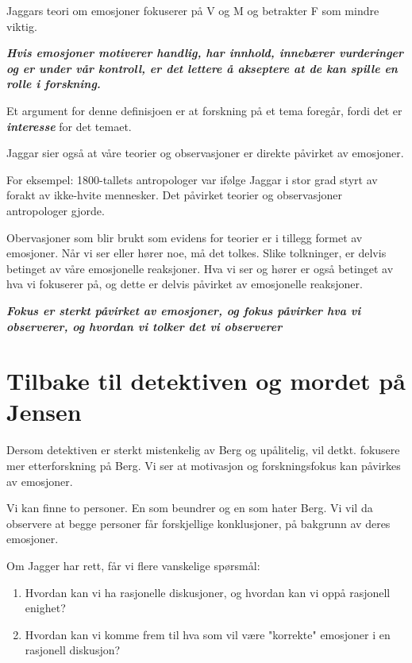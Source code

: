 \documentclass[11pt, a4paper]{article}
\begin{document}
\vspace{1em}

Jaggars teori om emosjoner fokuserer på V og M og betrakter F som mindre viktig. 
\vspace{1em}

\textbf{\textit{Hvis emosjoner motiverer handlig, har innhold, innebærer vurderinger og er under vår kontroll, er det lettere å akseptere at de kan spille en rolle i forskning.}}



Et argument for denne definisjoen er at forskning på et tema foregår, fordi det er \textbf{\textit{interesse}} for det temaet.

\vspace{1em}
Jaggar sier også at våre teorier og observasjoner er direkte påvirket av emosjoner.

For eksempel: 1800-tallets antropologer var ifølge Jaggar i stor grad styrt av forakt av ikke-hvite mennesker. Det påvirket teorier og observasjoner antropologer gjorde. 


Obervasjoner som blir brukt som evidens for teorier er i tillegg formet av emosjoner. Når vi ser eller hører noe, må det tolkes. Slike tolkninger, er delvis betinget av våre emosjonelle reaksjoner. Hva vi ser og hører er også betinget av hva vi fokuserer på, og dette er delvis påvirket av emosjonelle reaksjoner.


\textbf{\textit{Fokus er sterkt påvirket av emosjoner, og fokus påvirker hva vi observerer, og hvordan vi tolker det vi observerer}}


\section{Tilbake til detektiven og mordet på Jensen}

Dersom detektiven er sterkt mistenkelig av Berg og upålitelig, vil detkt. fokusere mer etterforskning på Berg. Vi ser at motivasjon og forskningsfokus kan påvirkes av emosjoner.


Vi kan finne to personer. En som beundrer og en som hater Berg. Vi vil da observere at begge personer får forskjellige konklusjoner, på bakgrunn av deres emosjoner.

Om Jagger har rett, får vi flere vanskelige spørsmål:

\begin{enumerate}
    \item Hvordan kan vi ha rasjonelle diskusjoner, og hvordan kan vi oppå rasjonell enighet?
    \item Hvordan kan vi komme frem til hva som vil være "korrekte" emosjoner i en rasjonell diskusjon?
\end{enumerate}
\end{document}
